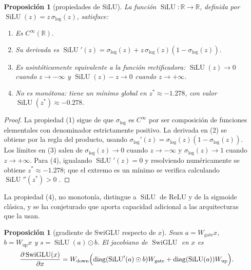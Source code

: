 \documentclass[11pt]{report}
\newenvironment{tcolorbox}[1][]{\par\medskip\noindent\ignorespaces}{\par\medskip}
\theoremstyle{definition}
\theoremstyle{plain}
\newtheorem{proposicion}[definicion]{Proposición}
\numberwithin{equation}{section}
\newcommand{\R}{\mathbb{R}}
\newcommand{\SwiGLU}{\operatorname{SwiGLU}}
\newcommand{\SiLU}{\operatorname{SiLU}}
\begin{document}
\begin{tcolorbox}[colback=blue!8, colframe=blue!8, boxrule=0pt]
\begin{proposicion}[propiedades de SiLU]
La función \(\SiLU:\R\to\R\), definida por \(\SiLU(z)=z\,\sigma_{\mathrm{log}}(z)\), satisface:
\begin{enumerate}
\item Es \(C^\infty(\R)\).
\item Su derivada es \(\SiLU'(z)=\sigma_{\mathrm{log}}(z)+z\,\sigma_{\mathrm{log}}(z)(1-\sigma_{\mathrm{log}}(z))\).
\item Es asintóticamente equivalente a la función rectificadora: \(\SiLU(z)\to 0\) cuando \(z\to-\infty\) y \(\SiLU(z)-z\to 0\) cuando \(z\to+\infty\).
\item No es monótona: tiene un mínimo global en \(z^*\approx -1.278\), con valor \(\SiLU(z^*)\approx -0.278\).
\end{enumerate}
\end{proposicion}
\end{tcolorbox}

\begin{proof}
La propiedad (1) sigue de que \(\sigma_{\mathrm{log}}\) es \(C^\infty\) por ser composición de funciones elementales con denominador estrictamente positivo. La derivada en (2) se obtiene por la regla del producto, usando \(\sigma_{\mathrm{log}}'(z)=\sigma_{\mathrm{log}}(z)(1-\sigma_{\mathrm{log}}(z))\). Los límites en (3) salen de \(\sigma_{\mathrm{log}}(z)\to 0\) cuando \(z\to-\infty\) y \(\sigma_{\mathrm{log}}(z)\to 1\) cuando \(z\to+\infty\). Para (4), igualando \(\SiLU'(z)=0\) y resolviendo numéricamente se obtiene \(z^*\approx -1.278\); que el extremo es un mínimo se verifica calculando \(\SiLU''(z^*)>0\) \citep{elfwing-uchibe-doya-2018-silu}.
\end{proof}

La propiedad (4), no monotonía, distingue a \(\SiLU\) de ReLU y de la sigmoide clásica, y se ha conjeturado que aporta capacidad adicional a las arquitecturas que la usan.

\begin{tcolorbox}[colback=blue!8, colframe=blue!8, boxrule=0pt]
\begin{proposicion}[gradiente de SwiGLU respecto de \(x\)]
Sean \(a=W_{\mathrm{gate}}x\), \(b=W_{\mathrm{up}}x\) y \(s=\SiLU(a)\odot b\). El jacobiano de \(\SwiGLU\) en \(x\) es
\begin{equation*}
    \frac{\partial\SwiGLU(x)}{\partial x}
    =
    W_{\mathrm{down}}\Bigl(
    \mathrm{diag}(\SiLU'(a)\odot b)W_{\mathrm{gate}}
    +
    \mathrm{diag}(\SiLU(a))W_{\mathrm{up}}
    \Bigr).
\end{equation*}
\end{proposicion}
\end{tcolorbox}
\end{document}
